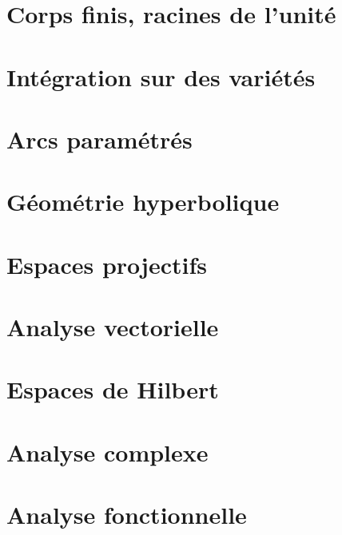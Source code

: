 \documentclass[a4paper,twoside,11pt]{book}
\begin{document}
\chapter{Corps finis, racines de l'unité}


\chapter{Intégration sur des variétés}







\chapter{Arcs paramétrés}




\chapter{Géométrie hyperbolique}


\chapter{Espaces projectifs}




\chapter{Analyse vectorielle}


\chapter{Espaces de Hilbert}


\chapter{Analyse complexe}          \label{ChapICHIooXbLccl}




\chapter{Analyse fonctionnelle}








\end{document}
